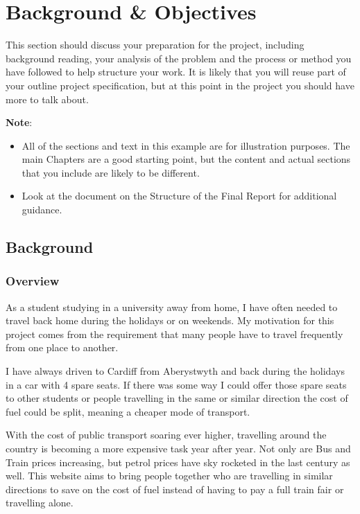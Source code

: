 \chapter{Background \& Objectives}

This section should discuss your preparation for the project, including background reading, your analysis of the problem and the process or method you have followed to help structure your work.  It is likely that you will reuse part of your outline project specification, but at this point in the project you should have more to talk about. 

\textbf{Note}: 

\begin{itemize}
   \item All of the sections and text in this example are for illustration purposes. The main Chapters are a good starting point, but the content and actual sections that you include are likely to be different.
   
   \item Look at the document on the Structure of the Final Report for additional guidance. 
   
\end {itemize}

\section{Background}
\subsection{Overview}
As a student studying in a university away from home, I have often needed to travel back home during the holidays or on weekends. My motivation for this project comes from the requirement that many people have to travel frequently from one place to another. 

I have always driven to Cardiff from Aberystwyth and back during the holidays in a car with 4 spare seats. If there was some way I could offer those spare seats to other students or people travelling in the same or similar direction the cost of fuel could be split, meaning a cheaper mode of transport.

With the cost of public transport soaring ever higher\cite{gov_public_transport_doc}, travelling around the country is becoming a more expensive task year after year. Not only are Bus and Train prices increasing, but petrol prices have sky rocketed in the last century\cite{guardian_fuel_prices} as well. This website aims to bring people together who are travelling in similar directions to save on the cost of fuel instead of having to pay a full train fair or travelling alone. 

